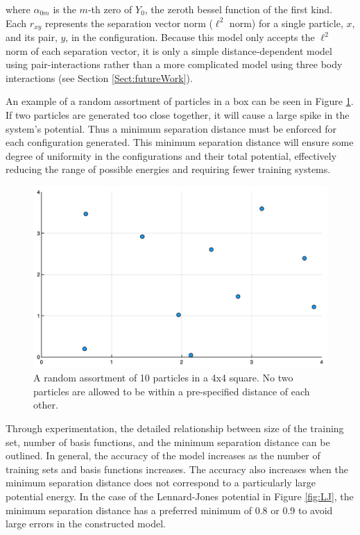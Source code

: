 where $\alpha_{0m}$ is the $m$-th zero of $Y_0$, the zeroth bessel function of the first kind. Each $r_{xy}$ represents the separation vector norm ($\ell^2$ norm) for a single particle, $x$, and its pair, $y$, in the configuration. Because this model only accepts the $\ell^2$ norm of each separation vector, it is only a simple distance-dependent model using pair-interactions rather than a more complicated model using three body interactions (see Section \ref{Sect:futureWork}).

\par An example of a random assortment of particles in a box can be seen in Figure \ref{fig:tenParticles}. If two particles are generated too close together, it will cause a large spike in the system's potential. Thus a minimum separation distance must be enforced for each configuration generated. This minimum separation distance will ensure some degree of uniformity in the configurations and their total potential, effectively reducing the range of possible energies and requiring fewer training systems. 

\begin{figure}[h]
\includegraphics[scale = 0.3]{Figures/tenParticles}
\caption{A random assortment of 10 particles in a 4x4 square. No two particles are allowed to be within a pre-specified distance of each other. 
\label{fig:tenParticles}} 
\end{figure}

\par Through experimentation, the detailed relationship between size of the training set, number of basis functions, and the minimum separation distance can be outlined. In general, the accuracy of the model increases as the number of training sets and basis functions increases. The accuracy also increases when the minimum separation distance does not correspond to a particularly large potential energy. In the case of the Lennard-Jones potential in Figure \ref{fig:LJ}, the minimum separation distance has a preferred minimum of 0.8 or 0.9 to avoid large errors in the constructed model.



